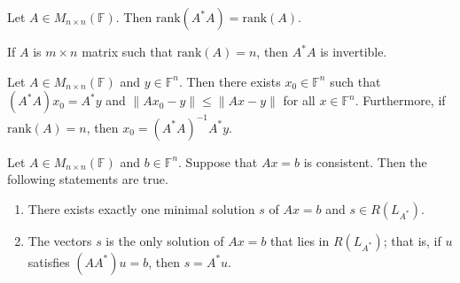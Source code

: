 \vspace{2cm}
\begin{lemma}
    Let \(A \in M_{n \times n}(\mathbb{F})\). Then \(\text{rank}(A^*A) = \text{rank}(A)\).
\end{lemma}
\vspace{2cm}
\begin{corollary}
    If \(A\) is \(m \times n\) matrix such that \(\text{rank}(A) = n\), then \(A^*A\) is invertible.
\end{corollary}
\vspace{1cm}
\begin{theorem}
    Let \(A \in M_{n \times n}(\mathbb{F})\) and \(y \in \mathbb{F}^n\). Then there exists \(x_0 \in \mathbb{F}^n\) such that \((A^*A)x_0 = A^*y\) and \(\lVert Ax_0 - y \rVert \leq \lVert Ax - y \rVert\) for all \(x \in \mathbb{F}^n\).
    Furthermore, if \(\text{rank}(A) = n\), then \(x_0 = (A^*A)^{-1}A^*y\).
\end{theorem}
\vspace{3cm}
\begin{theorem}
    Let \(A \in M_{n \times n}(\mathbb{F})\) and \(b \in \mathbb{F}^n\). Suppose that \(Ax=b\) is consistent. Then the following statements are true.
    \begin{enumerate}
        \item There exists exactly one minimal solution \(s\) of \(Ax=b\) and \(s \in R(L_{A^*})\).
        \item The vectors \(s\) is the only solution of \(Ax=b\) that lies in \(R(L_{A^*})\); that is, if \(u\) satisfies \((AA^*)u = b\), then \(s=A^*u\).
    \end{enumerate}
\end{theorem}
\newpage
